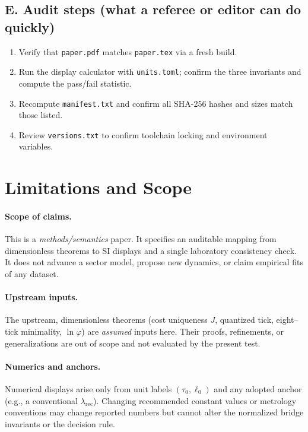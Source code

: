 \documentclass[11pt]{article}
\theoremstyle{plain}
\theoremstyle{definition}
\theoremstyle{remark}
\begin{document}
\subsection*{E. Audit steps (what a referee or editor can do quickly)}
\begin{enumerate}
  \item Verify that \texttt{paper.pdf} matches \texttt{paper.tex} via a fresh build.
  \item Run the display calculator with \texttt{units.toml}; confirm the three invariants and compute the pass/fail statistic.
  \item Recompute \texttt{manifest.txt} and confirm all SHA-256 hashes and sizes match those listed.
  \item Review \texttt{versions.txt} to confirm toolchain locking and environment variables.
\end{enumerate}

\section{Limitations and Scope}

\paragraph{Scope of claims.}
This is a \emph{methods/semantics} paper. It specifies an auditable mapping from dimensionless theorems to SI displays and a single laboratory consistency check. It does not advance a sector model, propose new dynamics, or claim empirical fits of any dataset.

\paragraph{Upstream inputs.}
The upstream, dimensionless theorems (cost uniqueness \(J\), quantized tick, eight–tick minimality, \(\ln\varphi\)) are \emph{assumed} inputs here. Their proofs, refinements, or generalizations are out of scope and not evaluated by the present test.

\paragraph{Numerics and anchors.}
Numerical displays arise only from unit labels \((\tau_{0},\ell_{0})\) and any adopted anchor (e.g., a conventional \(\lambda_{\mathrm{rec}}\)). Changing recommended constant values or metrology conventions may change reported numbers but cannot alter the normalized bridge invariants or the decision rule.
\end{document}
